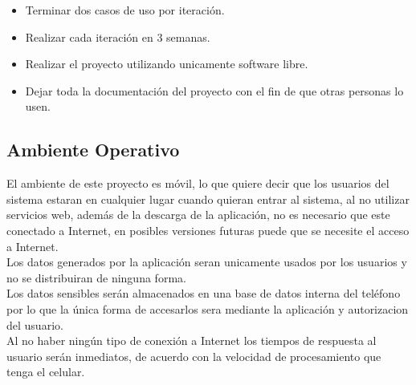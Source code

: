 \documentclass[12pt]{article}
\begin{document}
\begin{itemize}
	\item{Terminar dos casos de uso por iteraci\'on.}
	\item{Realizar cada iteraci\'on en 3 semanas.}
	\item{Realizar el proyecto utilizando unicamente software libre.}
	\item{Dejar toda la documentaci\'on del proyecto con el fin de que otras personas lo usen.}
\end{itemize}

\subsection{Ambiente Operativo}

El ambiente de este proyecto es m\'ovil, lo que quiere decir que los usuarios del sistema estaran en cualquier lugar cuando quieran entrar al sistema, al no utilizar servicios web, adem\'as de la descarga de la aplicaci\'on, no es necesario que este conectado a Internet, en posibles versiones futuras puede que se necesite el acceso a Internet.\\ 
Los datos generados por la aplicaci\'on seran unicamente usados por los usuarios y no se distribuiran de ninguna forma.\\
Los datos sensibles ser\'an almacenados en una base de datos interna del tel\'efono por lo que la \'unica forma de accesarlos sera mediante la aplicaci\'on y autorizacion del usuario.\\
Al no haber ning\'un tipo de conexi\'on a Internet los tiempos de respuesta al usuario ser\'an inmediatos, de acuerdo con la velocidad de procesamiento que tenga el celular.
\end{document}
